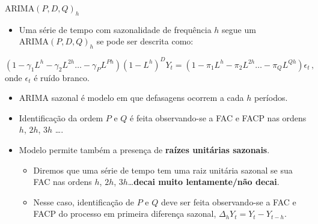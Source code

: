 \documentclass[11pt]{beamer}
\begin{document}
\begin{frame}{$\text{ARIMA}(P,D,Q)_h$}
\begin{itemize}
	\item Uma série de tempo com sazonalidade de frequência $h$ segue um $\text{ARIMA}(P,D,Q)_h$ se pode ser descrita como:
\end{itemize}

	$$(1-\gamma_1 L^h - \gamma_2 L^{2h} \ldots - \gamma_{P} L^{Ph})(1-L^h)^DY_t = (1-\pi_1 L^h - \pi_2 L^{2h} \ldots - \pi_{Q} L^{Qh})\epsilon_t \,, $$
	onde $\epsilon_t$ é ruído branco.
	
	\begin{itemize}
	\item ARIMA sazonal é modelo em que defasagens ocorrem a cada $h$ períodos.
	\item Identificação da ordem  $P$ e $Q$ é feita observando-se a FAC e FACP nas ordens $h$, $2h$, $3h$ \ldots.
	\item Modelo permite também a presença de \textbf{raízes unitárias sazonais}.
	\begin{itemize}
		\item Diremos que uma série de tempo tem uma raiz unitária sazonal se sua FAC nas ordens $h$, $2h$, $3h$\ldots \textbf{decai muito lentamente/não decai}.
		\item Nesse caso, identificação de $P$ e $Q$ deve ser feita observando-se a FAC e FACP do processo em primeira diferença sazonal, $\Delta_h Y_t = Y_t - Y_{t-h}$.
	\end{itemize} 
\end{itemize}
\end{frame}
\end{document}
